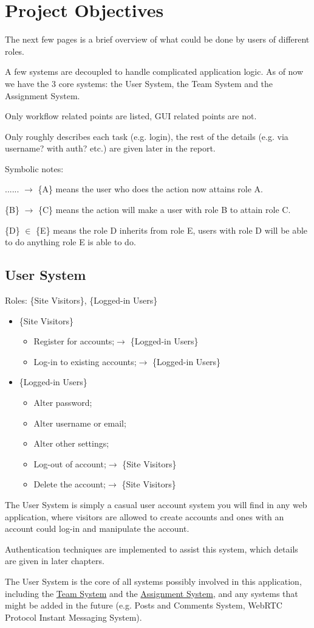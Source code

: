 \documentclass[12pt]{report}
\newcommand{\n}{\par}
\newcommand{\br}{\vspace{1 em}\n}
\begin{document}
\section{Project Objectives}\label{overview.project-objectives}
The next few pages is a brief overview of what could be done by users of different roles.\n
A few systems are decoupled to handle complicated application logic.
As of now we have the 3 core systems: the User System, the Team System and the Assignment System.
\br
Only workflow related points are listed, GUI related points are not.\n
Only roughly describes each task (e.g. login),
the rest of the details (e.g. via username? with auth? etc.) are given later in the report.
\br
Symbolic notes:\n
...... $\rightarrow$ \{A\} means the user who does the action now attains role A.\n
\{B\} $\rightarrow$ \{C\} means the action will make a user with role B to attain role C.\n
\{D\} $\in$ \{E\} means the role D inherits from role E, users with role D will be able to do anything role E is able to do.
\newpage

\subsection{User System}\label{overview.project-objectives.user-system}
Roles: \{Site Visitors\}, \{Logged-in Users\}\n
\begin{itemize}
	\item \{Site Visitors\}
	      \begin{itemize}
		      \item Register for accounts;\null\hfill $\rightarrow$ \{Logged-in Users\}
		      \item Log-in to existing accounts;\null\hfill $\rightarrow$ \{Logged-in Users\}
	      \end{itemize}
	\item \{Logged-in Users\}
	      \begin{itemize}
		      \item Alter password;
		      \item Alter username or email;
		      \item Alter other settings;
		      \item Log-out of account;\null\hfill $\rightarrow$ \{Site Visitors\}
		      \item Delete the account;\null\hfill $\rightarrow$ \{Site Visitors\}
	      \end{itemize}
\end{itemize}\n
The User System is simply a casual user account system you will find in any web application,
where visitors are allowed to create accounts and ones with an account could log-in and manipulate the account.
\br
Authentication techniques are implemented to assist this system, which details are given in later chapters.
\br
The User System is the core of all systems possibly involved in this application,
including the \hyperref[overview.project-objectives.team-system]{Team System}
and the \hyperref[overview.project-objectives.assignment-system]{Assignment System},
and any systems that might be added in the future (e.g. Posts and Comments System, WebRTC Protocol Instant Messaging System).
\newpage
\end{document}
